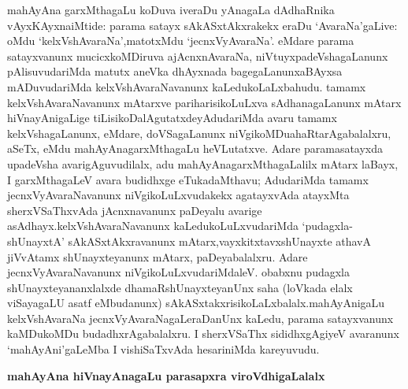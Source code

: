 mahAyAna garxMthagaLu koDuva iveraDu yAnagaLa dAdhaRnika vAyxKAyxna\break iMtide: parama satayx sAkASxtAkxrakekx eraDu `AvaraNa'gaLive: oMdu `kelxVshAvaraNa',\break matotxMdu `jecnxVyAvaraNa'. eMdare parama satayxvanunx mucicxkoMDiruva ajAcnxnA\-varaNa, niVtuyxpadeVshagaLanunx pAlisuvudariMda matutx aneVka dhAyxnada bagegaLanunx\break aBAyxsa mADuvudariMda kelxVshAvaraNa\-vanunx kaLedukoLaLxbahudu. tamamx kelxVshAvaraNa\-vanunx mAtarxve pariharisikoLuLxva sAdhanagaLanunx mAtarx hiVnayAnigaLige tiLisi\-koDa\-lAgutatxdeyAdudariMda avaru tamamx kelxVshagaLanunx, eMdare, doVSagaLanunx niVgikoMDu\break ahaRtarAgabalalxru, aSeTx, eMdu mahAyAnagarxMthagaLu heVLutatxve. Adare parama\break satayxda upadeVsha avarigAguvudilalx, adu mahAyAnagarxMthagaLalilx mAtarx laBayx, I garxMthagaLeV avara budidhxge eTukadaMthavu; AdudariMda tamamx jecnxVyAvaraNavanunx niVgi\-koLuLxvudakekx agatayxvAda atayxMta sherxVSaThxvAda jAcnxnavanunx paDeyalu avarige asAdhayx.\break kelxVshAvaraNavanunx kaLedukoLuLxvudariMda `pudagxla-shUnayxtA' sAkASxtAkxravanunx mAtarx,\break vayxkitxtavxshUnayxte athavA jiVvAtamx shUnayxteyanunx mAtarx, paDeyabalalxru. Adare jecnxVyA\-varaNavanunx niVgikoLuLxvudariMdaleV. obabxnu pudagxla shUnayxteyananxlalxde dhamaR\-shUnayxte\-yanUnx saha (loVkada elalx viSayagaLU asatf eMbudanunx) sAkASxtakxrisikoLaLxbalalx.\break mahAyAnigaLu kelxVshAvaraNa jecnxVyAvaraNagaLeraDanUnx kaLedu, parama satayxvanunx kaMDu\-koMDu budadhx\-rAgabalalxru. I sherxVSaThx sididhxgAgiyeV avaranunx `mahAyAni'gaLeMba I vishiSaTxvAda hesariniMda kareyuvudu.

\begin{center}
{\textbf{\Large mahAyAna hiVnayAnagaLu parasapxra viroVdhigaLalalx}}
\end{center}

